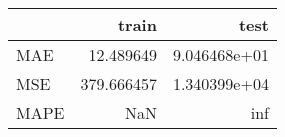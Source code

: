 \begin{tabular}{lrr}
\toprule
{} &       train &          test \\
\midrule
MAE  &   12.489649 &  9.046468e+01 \\
MSE  &  379.666457 &  1.340399e+04 \\
MAPE &         NaN &           inf \\
\bottomrule
\end{tabular}
